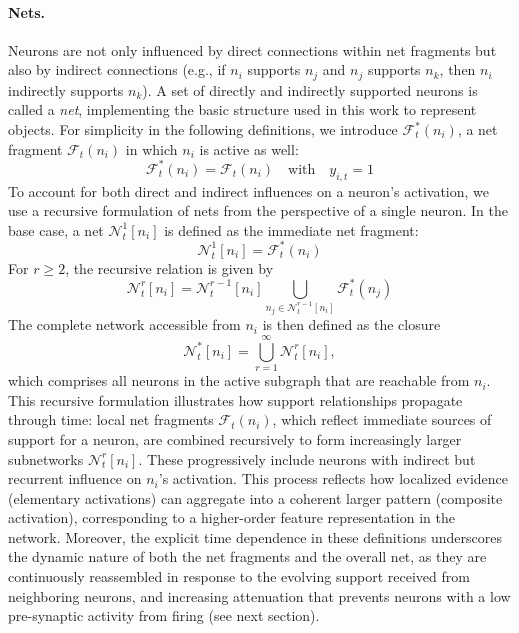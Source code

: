 \documentclass[12pt]{article}
\begin{document}
\paragraph{Nets.}
Neurons are not only influenced by direct connections within net fragments but also by indirect connections (e.g., if $n_i$ supports $n_j$ and $n_j$ supports $n_k$, then $n_i$ indirectly supports $n_k$).
A set of directly and indirectly supported neurons is called a \emph{net}, implementing the basic structure used in this work to represent objects.
For simplicity in the following definitions, we introduce $\mathcal{F}^*_{t}(n_i)$, a net fragment $\mathcal{F}_{t}(n_i)$ in which $n_i$ is active as well:
%
\begin{equation}
  \mathcal{F}^*_{t}(n_i) =\mathcal{F}_{t}(n_i) \quad \text{with} \quad  y_{i, t}=1
  \label{eq:net_fragments_full}
\end{equation}
%
To account for both direct and indirect influences on a neuron's activation, we use a recursive formulation of nets from the perspective of a single neuron. In the base case, a net $\mathcal{N}_t^{1}[n_i]$ is defined as the immediate net fragment:
%
\begin{equation}
    \mathcal{N}_t^{1}[n_i]  = \mathcal{F}^*_t(n_i)
\end{equation}
%
For $r \geq 2$, the recursive relation is given by
%
\begin{equation}
    \mathcal{N}_t^{r}[n_i]  = \mathcal{N}_t^{r-1}[n_i] \bigcup_{n_j \in \mathcal{N}_t^{r-1}[n_i]} \mathcal{F}^*_t(n_j)
    \label{eq:recursive_net_fragments}
\end{equation}
%
The complete network accessible from $n_i$ is then defined as the closure
%
\begin{equation}
    \mathcal{N}_t^{*}[n_i]  = \bigcup_{r=1}^{\infty} \mathcal{N}_t^{r}[n_i],
\end{equation}
%
which comprises all neurons in the active subgraph that are reachable from $n_i$.
This recursive formulation illustrates how support relationships propagate through time: local net fragments $\mathcal{F}_t(n_i)$, which reflect immediate sources of support for a neuron, are combined recursively to form increasingly larger subnetworks $\mathcal{N}_t^{r}[n_i]$. These progressively include neurons with indirect but recurrent influence on $n_i$'s activation. This process reflects how localized evidence (elementary activations) can aggregate into a coherent larger pattern (composite activation), corresponding to a higher-order feature representation in the network.
Moreover, the explicit time dependence in these definitions underscores the dynamic nature of both the net fragments and the overall net, as they are continuously reassembled in response to the evolving support received from neighboring neurons, and increasing attenuation that prevents neurons with a low pre-synaptic activity from firing (see next section).
\end{document}
